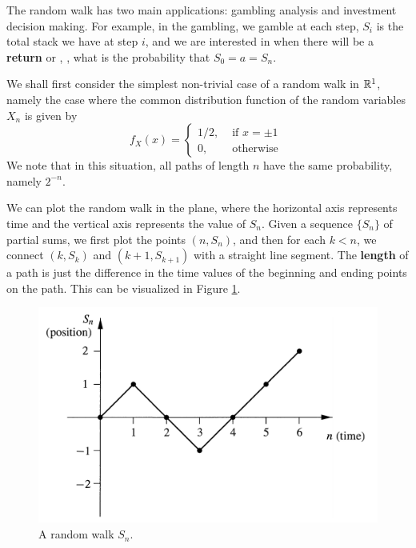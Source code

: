 The random walk has two main applications: gambling analysis and investment decision making. For example, in the gambling, we gamble at each step, $S_i$ is the total stack we have at step $i$, and we are interested in when there will be a \textbf{return} or , \ie, what is the probability that $S_0 = a = S_n$.

\begin{example}
We shall first consider the simplest non-trivial case of a random walk in $\mathbb{R}^1$, namely the case where the common distribution function of the random variables $X_n$ is given by
\begin{equation}
    \label{eq:9.1}
    \tag{9-1}
    f_{X}(x)=\left\{\begin{array}{ll}{1 / 2,} & {\text { if } x=\pm 1} \\ {0,} & {\text { otherwise }}\end{array}\right.
\end{equation}
We note that in this situation, all paths of length $n$ have the same probability, namely $2^{-n}$.

We can plot the random walk in the plane, where the horizontal axis represents time and the vertical axis represents the value of $S_n$. Given a sequence $\{S_n\}$ of partial sums, we first plot the points $(n, S_n)$, and then for each $k < n$, we connect $(k, S_k)$ and $(k + 1, S_{k+1})$ with a straight line segment. The \textbf{length} of a path is just the difference in the time values of the beginning and ending points on the path. This can be visualized in Figure \ref{fig:9.1}.

\begin{figure}[!htb]
    \centering
    \includegraphics[scale=0.3]{plots/random_walk.png}
    \caption{A random walk $S_n$.}
    \label{fig:9.1}
\end{figure}
\end{example}



